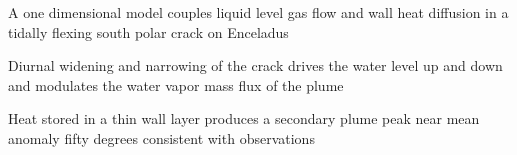 \documentclass[draft]{agujournal2019}
\begin{document}

\begin{keypoints}
\item A one dimensional model couples liquid level gas flow and wall heat diffusion in a tidally flexing south polar crack on Enceladus
\item Diurnal widening and narrowing of the crack drives the water level up and down and modulates the water vapor mass flux of the plume
\item Heat stored in a thin wall layer produces a secondary plume peak near mean anomaly fifty degrees consistent with observations
\end{keypoints}

%
%

%
%

\end{document}
